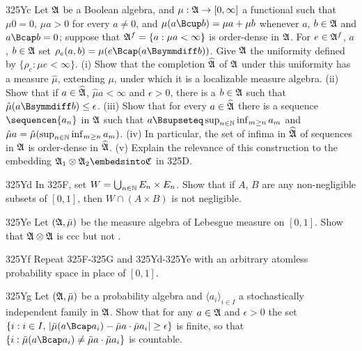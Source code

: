 {\spheader 325Yc
Let $\frak A$ be a Boolean algebra, and
$\mu:\frak A\to[0,\infty]$ a functional such that $\mu 0=0$, $\mu a>0$ for
every $a\ne 0$, and
$\mu(a\Bcup b)=\mu a+\mu b$ whenever $a$, $b\in \frak A$ and
$a\Bcap b=0$;   suppose that $\frak A^f=\{a:\mu a<\infty\}$ is
order-dense in $\frak A$.  For $e\in\frak A^f$, $a$, $b\in\frak A$ set
$\rho_e(a,b)=\mu(e\Bcap(a\Bsymmdiff b))$.   Give $\frak A$
the uniformity defined by $\{\rho_e:\mu e<\infty\}$.   (i) Show that the
completion $\widehat{\frak A}$ of $\frak A$ under this uniformity has a
measure $\hat\mu$, extending
$\mu$, under which it is a localizable measure algebra.   (ii) Show that
if $a\in\widehat{\frak A}$, $\hat\mu a<\infty$ and $\epsilon>0$, there
is a $b\in\frak A$ such that $\hat\mu(a\Bsymmdiff b)\le\epsilon$.
(iii) Show that for every $a\in\widehat{\frak A}$ there is a sequence
$\sequencen{a_n}$ in $\frak A$ such that
$a\Bsupseteq\sup_{n\in\Bbb N}\inf_{m\ge n}a_m$ and
$\hat\mu a=\hat\mu(\sup_{n\in\Bbb N}\inf_{m\ge n}a_m)$.
(iv) In particular, the set of infima in $\widehat{\frak A}$
of sequences in $\frak A$ is
order-dense in $\widehat{\frak A}$.   (v) Explain the relevance of this
construction to the embedding
$\frak A_1\otimes\frak A_2\embedsinto\frak C$ in 325D.

\spheader 325Yd In 325F, set $W=\bigcup_{n\in\Bbb N}E_n\times E_n$.   Show that if $A$, $B$ are any non-negligible subsets
of $[0,1]$, then $W\cap(A\times B)$ is not negligible.

\spheader 325Ye Let $(\frak A,\bar\mu)$ be the measure algebra of
Lebesgue measure on $[0,1]$.   Show that $\frak A\otimes\frak A$ is ccc
but not \wsid.   

\spheader 325Yf Repeat 325F-325G and 325Yd-325Ye with an arbitrary
atomless probability space in place of $[0,1]$.

\spheader 325Yg Let $(\frak A,\bar\mu)$ be a probability algebra and
$\langle a_i\rangle_{i\in I}$ a stochastically independent family in
$\frak A$.   Show that for any $a\in\frak A$ and $\epsilon>0$ the set
$\{i:i\in I,\,
  |\bar\mu(a\Bcap a_i)-\bar\mu a\cdot\bar\mu a_i|\ge\epsilon\}$ is finite,
so that
$\{i:\bar\mu(a\Bcap a_i)\ne\bar\mu a\cdot\bar\mu a_i\}$ is countable.
}%

